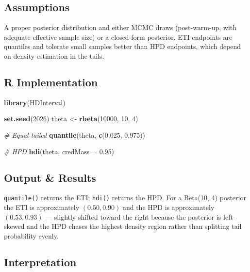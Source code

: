 \documentclass[
]{article}
\newenvironment{Shaded}{\begin{snugshade}}{\end{snugshade}}
\newcommand{\AttributeTok}[1]{\textcolor[rgb]{0.13,0.29,0.53}{#1}}
\newcommand{\CommentTok}[1]{\textcolor[rgb]{0.56,0.35,0.01}{\textit{#1}}}
\newcommand{\DecValTok}[1]{\textcolor[rgb]{0.00,0.00,0.81}{#1}}
\newcommand{\FloatTok}[1]{\textcolor[rgb]{0.00,0.00,0.81}{#1}}
\newcommand{\FunctionTok}[1]{\textcolor[rgb]{0.13,0.29,0.53}{\textbf{#1}}}
\newcommand{\NormalTok}[1]{#1}
\newcommand{\OtherTok}[1]{\textcolor[rgb]{0.56,0.35,0.01}{#1}}
\begin{document}
\subsection{Assumptions}\label{assumptions}

A proper posterior distribution and either MCMC draws (post-warm-up,
with adequate effective sample size) or a closed-form posterior. ETI
endpoints are quantiles and tolerate small samples better than HPD
endpoints, which depend on density estimation in the tails.

\subsection{R Implementation}\label{r-implementation}

\begin{Shaded}
\begin{Highlighting}[]
\FunctionTok{library}\NormalTok{(HDInterval)}

\FunctionTok{set.seed}\NormalTok{(}\DecValTok{2026}\NormalTok{)}
\NormalTok{theta }\OtherTok{\textless{}{-}} \FunctionTok{rbeta}\NormalTok{(}\DecValTok{10000}\NormalTok{, }\DecValTok{10}\NormalTok{, }\DecValTok{4}\NormalTok{)}

\CommentTok{\# Equal{-}tailed}
\FunctionTok{quantile}\NormalTok{(theta, }\FunctionTok{c}\NormalTok{(}\FloatTok{0.025}\NormalTok{, }\FloatTok{0.975}\NormalTok{))}

\CommentTok{\# HPD}
\FunctionTok{hdi}\NormalTok{(theta, }\AttributeTok{credMass =} \FloatTok{0.95}\NormalTok{)}
\end{Highlighting}
\end{Shaded}

\subsection{Output \& Results}\label{output-results}

\texttt{quantile()} returns the ETI; \texttt{hdi()} returns the HPD. For
a Beta(10, 4) posterior the ETI is approximately \((0.50, 0.90)\) and
the HPD is approximately \((0.53, 0.93)\) --- slightly shifted toward
the right because the posterior is left-skewed and the HPD chases the
highest density region rather than splitting tail probability evenly.

\subsection{Interpretation}\label{interpretation}
\end{document}
